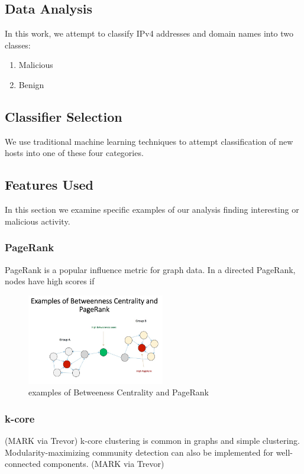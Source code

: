 \documentclass{acm_proc_article-sp}
\begin{document}
\subsection{Data Analysis}
In this work, we attempt to classify IPv4 addresses and domain names into two classes:
\begin{enumerate}
    \item Malicious
    \item Benign
\end{enumerate}  

\subsection{Classifier Selection}
We use traditional machine learning techniques to attempt classification of new hosts into one of these four categories.

\subsection{Features Used}


In this section we examine specific examples of our analysis finding interesting or malicious activity.


\subsubsection{PageRank}
PageRank is a popular influence metric for graph data. In a directed PageRank, nodes have high scores if 

\begin{figure}[ht!]
\centering
\includegraphics[width=60mm]{images/20160417 image ex of betweenes centrality and pagerank jpeg.jpg}
\caption{examples of Betweeness Centrality and PageRank \label{overflow}}
\end{figure}


\subsubsection{k-core}

(MARK via Trevor)
k-core clustering is common in graphs and simple clustering. Modularity-maximizing community detection can also be implemented for well-connected components.
(MARK via Trevor)
\end{document}
